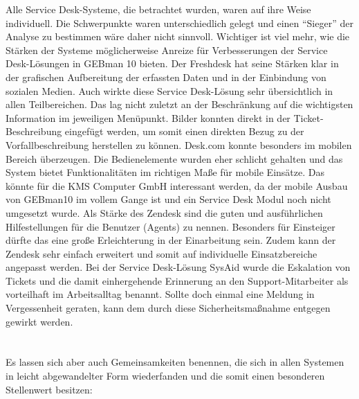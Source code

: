 \noindent
Alle Service Desk-Systeme, die betrachtet wurden, waren auf ihre Weise individuell. Die Schwerpunkte waren unterschiedlich gelegt und einen \enquote{Sieger} der Analyse zu bestimmen wäre daher nicht sinnvoll. Wichtiger ist viel mehr, wie die Stärken der Systeme möglicherweise Anreize für Verbesserungen der Service Desk-Lösungen in GEBman 10 bieten.\newline
Der Freshdesk hat seine Stärken klar in der grafischen Aufbereitung der erfassten Daten und in der Einbindung von sozialen Medien. Auch wirkte diese Service Desk-Lösung sehr übersichtlich in allen Teilbereichen. Das lag nicht zuletzt an der Beschränkung auf die wichtigsten Information im jeweiligen Menüpunkt. Bilder konnten direkt in der Ticket-Beschreibung eingefügt werden, um somit einen direkten Bezug zu der Vorfallbeschreibung herstellen zu können.
\newline
Desk.com konnte besonders im mobilen Bereich überzeugen. Die Bedienelemente wurden eher schlicht gehalten und das System bietet Funktionalitäten im richtigen Maße für mobile Einsätze. Das könnte für die KMS Computer GmbH interessant werden, da der mobile Ausbau von GEBman10 im vollem Gange ist und ein Service Desk Modul noch nicht umgesetzt wurde. \newline
Als Stärke des Zendesk sind die guten und ausführlichen Hilfestellungen für die Benutzer (Agents) zu nennen. Besonders für Einsteiger dürfte das eine große Erleichterung in der Einarbeitung sein. Zudem kann der Zendesk sehr einfach erweitert und somit auf individuelle Einsatzbereiche angepasst werden. \newline
Bei der Service Desk-Lösung SysAid wurde die Eskalation von Tickets und die damit einhergehende Erinnerung an den Support-Mitarbeiter als vorteilhaft im Arbeitsalltag benannt. Sollte doch einmal eine Meldung in Vergessenheit geraten, kann dem durch diese Sicherheitsmaßnahme entgegen gewirkt werden.\\\\\\

\noindent
Es lassen sich aber auch Gemeinsamkeiten benennen, die sich in allen Systemen in leicht abgewandelter Form wiederfanden und die somit einen besonderen Stellenwert besitzen:


